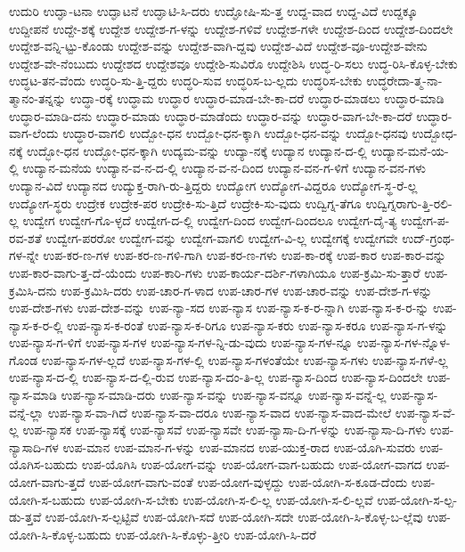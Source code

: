 {ಉದುರಿ
ಉದ್ಘಾ-ಟನಾ
ಉದ್ಘಾಟನೆ
ಉದ್ಘಾಟಿ-ಸಿ-ದರು
ಉದ್ಘೋಷಿ-ಸು-ತ್ತ
ಉದ್ದ-ವಾದ
ಉದ್ದ-ವಿದೆ
ಉದ್ದಕ್ಕೂ
ಉದ್ದೀಪನೆ
ಉದ್ದೇ-ಶಕ್ಕೆ
ಉದ್ದೇಶ
ಉದ್ದೇಶ-ಗ-ಳನ್ನು
ಉದ್ದೇಶ-ಗಳಿವೆ
ಉದ್ದೇಶ-ಗಳೇ
ಉದ್ದೇಶ-ದಿಂದ
ಉದ್ದೇಶ-ದಿಂದಲೇ
ಉದ್ದೇಶ-ವನ್ನಿ-ಟ್ಟು-ಕೊಂಡು
ಉದ್ದೇಶ-ವನ್ನು
ಉದ್ದೇಶ-ವಾಗಿ-ದ್ದವು
ಉದ್ದೇಶ-ವಿದೆ
ಉದ್ದೇಶ-ವೂ-ಉದ್ದೇಶ-ವೇನು
ಉದ್ದೇಶ-ವೇ-ನೆಂಬುದು
ಉದ್ದೇಶದ
ಉದ್ದೇಶವೂ
ಉದ್ದೇಶಿ-ಸುವಿರೊ
ಉದ್ದೇಶಿಸಿ
ಉದ್ಧ-ರಿ-ಸಲು
ಉದ್ಧ-ರಿಸಿ-ಕೊಳ್ಳ-ಬೇಕು
ಉದ್ಧಟ-ತನ-ವೆಂದು
ಉದ್ಧರಿ-ಸು-ತ್ತಿ-ದ್ದರು
ಉದ್ಧರಿ-ಸುವ
ಉದ್ಧರಿಸ-ಬ-ಲ್ಲದು
ಉದ್ಧರಿಸ-ಬೇಕು
ಉದ್ಧರೇದಾ-ತ್ಮ-ನಾ-ತ್ಮಾನಂ-ತನ್ನನ್ನು
ಉದ್ಧಾ-ರಕ್ಕೆ
ಉದ್ಧಾಮ
ಉದ್ಧಾರ
ಉದ್ಧಾರ-ಮಾಡ-ಬೇ-ಕಾ-ದರೆ
ಉದ್ಧಾರ-ಮಾಡಲು
ಉದ್ಧಾರ-ಮಾಡಿ
ಉದ್ಧಾರ-ಮಾಡಿ-ದನು
ಉದ್ಧಾರ-ಮಾಡು
ಉದ್ಧಾರ-ಮಾಡೆಂದು
ಉದ್ಧಾರ-ವನ್ನು
ಉದ್ಧಾರ-ವಾಗ-ಬೇ-ಕಾ-ದರೆ
ಉದ್ಧಾರ-ವಾಗ-ಲೆಂದು
ಉದ್ಧಾರ-ವಾಗಲಿ
ಉದ್ಬೋ-ಧನ
ಉದ್ಬೋ-ಧನ-ಕ್ಕಾಗಿ
ಉದ್ಬೋ-ಧನ-ವನ್ನು
ಉದ್ಬೋ-ಧನವು
ಉದ್ಬೋಧ-ನಕ್ಕೆ
ಉದ್ಭೋ-ಧನ
ಉದ್ಭೋ-ಧನ-ಕ್ಕಾಗಿ
ಉದ್ಯಮ-ವನ್ನು
ಉದ್ಯಾ-ನಕ್ಕೆ
ಉದ್ಯಾನ
ಉದ್ಯಾನ-ದ-ಲ್ಲಿ
ಉದ್ಯಾನ-ಮನೆ-ಯ-ಲ್ಲಿ
ಉದ್ಯಾನ-ಮನೆಯ
ಉದ್ಯಾನ-ವ-ನ-ದ-ಲ್ಲಿ
ಉದ್ಯಾನ-ವ-ನ-ದಿಂದ
ಉದ್ಯಾನ-ವನ-ಗ-ಳಿಗೆ
ಉದ್ಯಾನ-ವನ-ಗಳು
ಉದ್ಯಾನ-ವಿದೆ
ಉದ್ಯಾನದ
ಉದ್ಯುಕ್ತ-ರಾಗಿ-ರು-ತ್ತಿದ್ದರು
ಉದ್ಯೋಗ
ಉದ್ಯೋಗ-ವಿದ್ದರೂ
ಉದ್ಯೋಗ-ಸ್ಥ-ರೆ-ಲ್ಲ
ಉದ್ಯೋಗ-ಸ್ಥರು
ಉದ್ರೇಕ
ಉದ್ರೇಕ-ಪರ
ಉದ್ರೇಕಿ-ಸು-ತ್ತಿದೆ
ಉದ್ರೇಕಿ-ಸು-ವುದು
ಉದ್ವಿಗ್ನ-ತೆಗೂ
ಉದ್ವಿಗ್ನರಾಗು-ತ್ತಿ-ರಲಿ-ಲ್ಲ
ಉದ್ವೇಗ
ಉದ್ವೇಗ-ಗೊ-ಳ್ಳದೆ
ಉದ್ವೇಗ-ದ-ಲ್ಲಿ
ಉದ್ವೇಗ-ದಿಂದ
ಉದ್ವೇಗ-ದಿಂದಲೂ
ಉದ್ವೇಗ-ದೈ-ತ್ಯ
ಉದ್ವೇಗ-ಪ-ರವ-ಶತೆ
ಉದ್ವೇಗ-ಪರರೋ
ಉದ್ವೇಗ-ವನ್ನು
ಉದ್ವೇಗ-ವಾಗಲಿ
ಉದ್ವೇಗ-ವಿ-ಲ್ಲ
ಉದ್ವೇಗಕ್ಕೆ
ಉದ್ವೇಗವೇ
ಉದ್-ಗ್ರಂಥ-ಗಳ-ನ್ನೇ
ಉಪ-ಕರ-ಣ-ಗಳ
ಉಪ-ಕರ-ಣ-ಗಳಿ-ಗಾಗಿ
ಉಪ-ಕರ-ಣ-ಗಳು
ಉಪ-ಕಾ-ರಕ್ಕೆ
ಉಪ-ಕಾರ
ಉಪ-ಕಾರ-ವನ್ನು
ಉಪ-ಕಾರ-ವಾಗು-ತ್ತ-ದೆ-ಯೆಂದು
ಉಪ-ಕಾರಿ-ಗಳು
ಉಪ-ಕಾರ್ಯ-ದರ್ಶಿ-ಗಳಾಗಿಯೂ
ಉಪ-ಕ್ರಮಿ-ಸು-ತ್ತಾರೆ
ಉಪ-ಕ್ರಮಿಸಿ-ದನು
ಉಪ-ಕ್ರಮಿಸಿ-ದರು
ಉಪ-ಚಾರ-ಗ-ಳಾದ
ಉಪ-ಚಾರ-ಗಳ
ಉಪ-ಚಾರ-ವನ್ನು
ಉಪ-ದೇಶ-ಗ-ಳನ್ನು
ಉಪ-ದೇಶ-ಗಳು
ಉಪ-ದೇಶ-ವನ್ನು
ಉಪ-ನ್ಯಾ-ಸದ
ಉಪ-ನ್ಯಾಸ
ಉಪ-ನ್ಯಾಸ-ಕ-ರ-ನ್ನಾಗಿ
ಉಪ-ನ್ಯಾಸ-ಕ-ರ-ನ್ನು
ಉಪ-ನ್ಯಾಸ-ಕ-ರ-ಲ್ಲಿ
ಉಪ-ನ್ಯಾಸ-ಕ-ರಂತೆ
ಉಪ-ನ್ಯಾಸ-ಕ-ರಿಗೂ
ಉಪ-ನ್ಯಾಸ-ಕರು
ಉಪ-ನ್ಯಾಸ-ಕರೂ
ಉಪ-ನ್ಯಾಸ-ಗ-ಳನ್ನು
ಉಪ-ನ್ಯಾಸ-ಗ-ಳಿಗೆ
ಉಪ-ನ್ಯಾಸ-ಗಳ
ಉಪ-ನ್ಯಾಸ-ಗಳ-ನ್ನಿ-ಡು-ವುದು
ಉಪ-ನ್ಯಾಸ-ಗಳ-ನ್ನೂ
ಉಪ-ನ್ಯಾಸ-ಗಳ-ನ್ನೊಳ-ಗೊಂಡ
ಉಪ-ನ್ಯಾಸ-ಗಳ-ಲ್ಲದೆ
ಉಪ-ನ್ಯಾಸ-ಗಳ-ಲ್ಲಿ
ಉಪ-ನ್ಯಾಸ-ಗಳಂತೆಯೇ
ಉಪ-ನ್ಯಾಸ-ಗಳು
ಉಪ-ನ್ಯಾಸ-ಗಳೆ-ಲ್ಲ
ಉಪ-ನ್ಯಾಸ-ದ-ಲ್ಲಿ
ಉಪ-ನ್ಯಾಸ-ದ-ಲ್ಲಿ-ರುವ
ಉಪ-ನ್ಯಾಸ-ದಂ-ತಿ-ಲ್ಲ
ಉಪ-ನ್ಯಾಸ-ದಿಂದ
ಉಪ-ನ್ಯಾಸ-ದಿಂದಲೇ
ಉಪ-ನ್ಯಾಸ-ಮಾಡಿ
ಉಪ-ನ್ಯಾಸ-ಮಾಡಿ-ದರು
ಉಪ-ನ್ಯಾಸ-ವನ್ನು
ಉಪ-ನ್ಯಾಸ-ವನ್ನೂ
ಉಪ-ನ್ಯಾಸ-ವನ್ನೆ-ಲ್ಲ
ಉಪ-ನ್ಯಾಸ-ವನ್ನೆ-ಲ್ಲಾ
ಉಪ-ನ್ಯಾಸ-ವಾ-ಗಿದೆ
ಉಪ-ನ್ಯಾಸ-ವಾ-ದರೂ
ಉಪ-ನ್ಯಾಸ-ವಾದ
ಉಪ-ನ್ಯಾಸ-ವಾದ-ಮೇಲೆ
ಉಪ-ನ್ಯಾಸ-ವೆ-ಲ್ಲ
ಉಪ-ನ್ಯಾಸಕ
ಉಪ-ನ್ಯಾಸಕ್ಕೆ
ಉಪ-ನ್ಯಾಸವೆ
ಉಪ-ನ್ಯಾಸವೇ
ಉಪ-ನ್ಯಾಸಾ-ದಿ-ಗ-ಳನ್ನು
ಉಪ-ನ್ಯಾಸಾ-ದಿ-ಗಳು
ಉಪ-ನ್ಯಾಸಾದಿ-ಗಳ
ಉಪ-ಮಾನ
ಉಪ-ಮಾನ-ಗ-ಳನ್ನು
ಉಪ-ಮಾನದ
ಉಪ-ಯುಕ್ತ-ರಾದ
ಉಪ-ಯೊಗಿ-ಸುವರು
ಉಪ-ಯೊಗಿಸ-ಬಹುದು
ಉಪ-ಯೊಗಿಸಿ
ಉಪ-ಯೋಗ-ವನ್ನು
ಉಪ-ಯೋಗ-ವಾಗ-ಬಹುದು
ಉಪ-ಯೋಗ-ವಾಗದ
ಉಪ-ಯೋಗ-ವಾಗು-ತ್ತದೆ
ಉಪ-ಯೋಗ-ವಾಗು-ವಂತೆ
ಉಪ-ಯೋಗ-ವುಳ್ಳದ್ದು
ಉಪ-ಯೋಗಿ-ಸ-ಕೂಡ-ದೆಂದು
ಉಪ-ಯೋಗಿ-ಸ-ಬಹುದು
ಉಪ-ಯೋಗಿ-ಸ-ಬೇಕು
ಉಪ-ಯೋಗಿ-ಸ-ಲಿ-ಲ್ಲ
ಉಪ-ಯೋಗಿ-ಸ-ಲಿ-ಲ್ಲವೆ
ಉಪ-ಯೋಗಿ-ಸ-ಲ್ಪ-ಡು-ತ್ತವೆ
ಉಪ-ಯೋಗಿ-ಸ-ಲ್ಪಟ್ಟಿವೆ
ಉಪ-ಯೋಗಿ-ಸದೆ
ಉಪ-ಯೋಗಿ-ಸದೇ
ಉಪ-ಯೋಗಿ-ಸಿ-ಕೊಳ್ಳ-ಬ-ಲ್ಲೆವು
ಉಪ-ಯೋಗಿ-ಸಿ-ಕೊಳ್ಳ-ಬಹುದು
ಉಪ-ಯೋಗಿ-ಸಿ-ಕೊಳ್ಳು-ತ್ತೀರಿ
ಉಪ-ಯೋಗಿ-ಸಿ-ದರೆ
}
